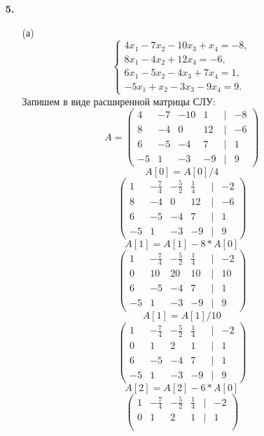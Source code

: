 \documentclass[a4paper]{article}
\newcommand{\mat}[1]{\begin{pmatrix} #1 \end{pmatrix}}
\newcommand{\case}[1]{\begin{cases} #1 \end{cases}}
\begin{document}
\begin{enumerate}
    \item[\textbf{5.}]
    \begin{enumerate}
        \item[(а)]$$
        \case{
            4x_1 - 7x_2 - 10x_3 + x_4 = -8, \\
            8x_1 - 4x_2 + 12x_4 = -6, \\
            6x_1 - 5x_2 - 4x_3 + 7x_4 = 1, \\
            -5x_1 + x_2 - 3x_3 - 9x_4 = 9.
        }$$
        Запишем в виде расширенной матрицы СЛУ:
        $$A = \mat{
            4  & -7  & -10  & 1  & | & -8  \\
            8  & -4  & 0    & 12 & | & -6  \\
            6  & -5  & -4   & 7  & | & 1   \\
            -5 & 1   & -3   & -9 & | & 9
        }$$
        $$A[0] = A[0]/4$$
        $$\mat{
            1      & -\frac{7}{4}  & -\frac{5}{2}  & \frac{1}{4}  & | & -2  \\
            8      & -4            & 0             & 12          & | & -6  \\
            6      & -5            & -4            & 7           & | & 1   \\
            -5     & 1             & -3            & -9          & | & 9
        }$$
        $$A[1] = A[1]-8*A[0]$$
        $$\mat{
            1      & -\frac{7}{4}  & -\frac{5}{2}  & \frac{1}{4}  & | & -2  \\
            0      & 10            & 20            & 10          & | & 10  \\
            6      & -5            & -4            & 7           & | & 1   \\
            -5     & 1             & -3            & -9          & | &9
        }$$
        $$A[1] = A[1]/10$$
        $$\mat{
            1      & -\frac{7}{4}  & -\frac{5}{2}  & \frac{1}{4}  & | & -2  \\
            0      & 1             & 2             & 1           & |&  1   \\
            6      & -5            & -4            & 7           & | &1   \\
            -5     & 1             & -3            & -9          & | &9
        }$$
        $$A[2] = A[2] - 6*A[0]$$
        $$\mat{
            1      & -\frac{7}{4}  & -\frac{5}{2}  & \frac{1}{4}  & | &-2  \\
            0      & 1             & 2             & 1           & | &1   \\
}$$
\end{enumerate}
\end{enumerate}
\end{document}
